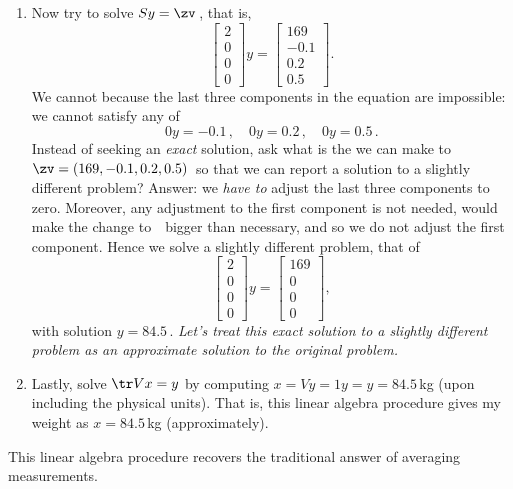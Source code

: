 \begin{example}
\begin{enumerate}
\item  Now try to solve \(Sy=\zv\)\,, that is,
\begin{equation*}
\begin{bmatrix} 2\\0\\0\\0 \end{bmatrix}y
=\begin{bmatrix} 169\\-0.1\\0.2\\0.5 \end{bmatrix}.
\end{equation*}
We cannot because the last three components in the equation are impossible: we cannot satisfy any of
\begin{equation*}
0y=-0.1\,,\quad
0y=0.2\,,\quad
0y=0.5\,.
\end{equation*}
Instead of seeking an \emph{exact} solution, ask what is the \emph{} we can make to~\(\zv=(169,-0.1,0.2,0.5)\)\ so that we can report a solution to a slightly different problem?
Answer: we \emph{have to} adjust the last three components to zero. 
Moreover, any adjustment to the first component is not needed, would make the change to~\zv\ bigger than necessary, and so we do not adjust the first component.
Hence we solve a slightly different problem, that of
\begin{equation*}
\begin{bmatrix} 2\\0\\0\\0 \end{bmatrix}y
=\begin{bmatrix} 169\\0\\0\\0 \end{bmatrix},
\end{equation*}
with solution \(y=84.5\)\,.
\emph{Let's treat this exact solution to a slightly different problem as an \emph{approximate} solution to the original problem.}

\item Lastly, solve \(\tr Vx=y\) by computing \(x=Vy=1y=y=84.5\)\,kg (upon including the physical units).
That is, this linear algebra procedure gives my weight as \(x=84.5\)\,kg (approximately).
\end{enumerate}
This linear algebra procedure recovers the traditional answer of averaging measurements.
\end{example}

